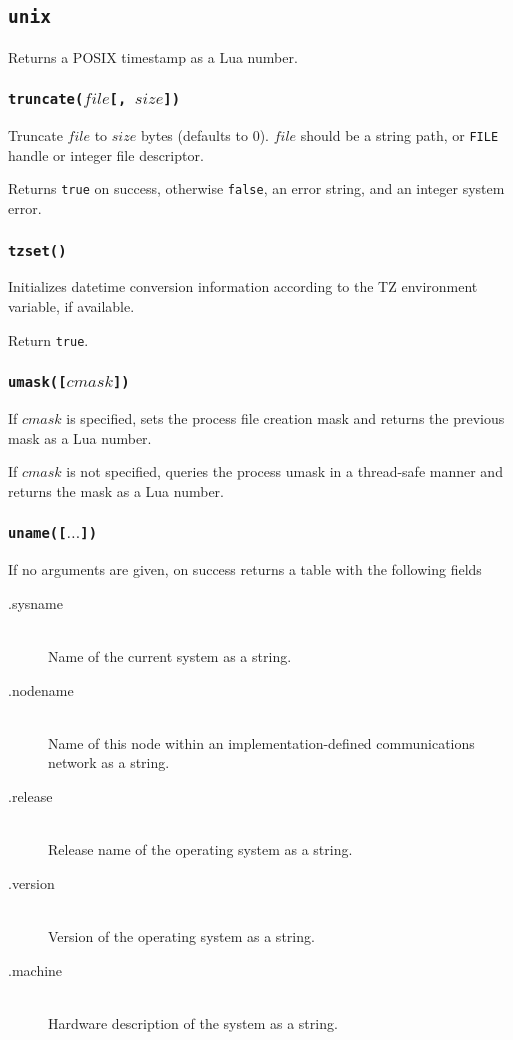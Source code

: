 \documentclass[11pt, oneside]{memoir}
\newcommand*{\true}[0]{\texttt{true}\xspace}
\newcommand*{\false}[0]{\texttt{false}\xspace}
\newcommand*{\fn}[1]{\texttt{#1}\xspace}
\newcommand*{\const}[1]{\texttt{#1}\xspace}
\newcounter{toccols}
\newenvironment{Module}[1]{
	\subsection{\texttt{#1}}
	\addtocontents{toc}{
		\protect\begin{multicols}{\value{toccols}}
	}
}{
	\addtocontents{toc}{\protect\end{multicols}}
}
\begin{document}
\begin{Module}{unix}
Returns a POSIX timestamp as a Lua number.

\subsubsection[\fn{truncate}]{\fn{truncate($file$[, $size$])}}

Truncate $file$ to $size$ bytes (defaults to 0). $file$ should be a string path, or \const{FILE} handle or integer file descriptor.

Returns \true on success, otherwise \false, an error string, and an integer system error. 

\subsubsection[\fn{tzset}]{\fn{tzset()}}

Initializes datetime conversion information according to the TZ environment variable, if available.

Return \true.

\subsubsection[\fn{umask}]{\fn{umask([$cmask$])}}

If $cmask$ is specified, sets the process file creation mask and returns the previous mask as a Lua number.

If $cmask$ is not specified, queries the process umask in a thread-safe manner and returns the mask as a Lua number.

\subsubsection[\fn{uname}]{\fn{uname([$\ldots$])}}

If no arguments are given, on success returns a table with the following fields

\begin{description}
\item[.sysname] \hfill \\
Name of the current system as a string.
\item[.nodename] \hfill \\
Name of this node within an implementation-defined communications network as a string.
\item[.release] \hfill \\
Release name of the operating system as a string.
\item[.version] \hfill \\
Version of the operating system as a string.
\item[.machine] \hfill \\
Hardware description of the system as a string.
\end{description}


\end{Module}
\end{document}
